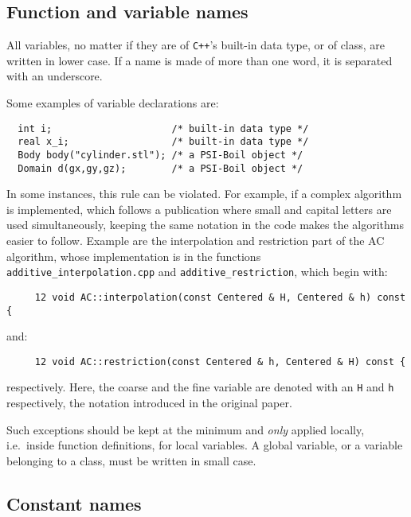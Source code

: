 \subsection{Function and variable names}

All variables, no matter if they are of {\tt C++}'s built-in data type, or of
{\psiboil} class, are written in lower case. If a name is made of more than
one word, it is separated with an underscore. 

Some examples of variable declarations are:
{\small \begin{verbatim}
  int i;                     /* built-in data type */  
  real x_i;                  /* built-in data type */  
  Body body("cylinder.stl"); /* a PSI-Boil object */ 
  Domain d(gx,gy,gz);        /* a PSI-Boil object */ 
\end{verbatim}}

In some instances, this rule can be violated. For example, if a complex 
algorithm is implemented, which follows a publication where small and capital
letters are used simultaneously, keeping the same notation in the code makes
the algorithms easier to follow. Example are the interpolation and restriction
part of the AC algorithm, whose implementation is in the functions 
{\tt additive\_interpolation.cpp} and {\tt additive\_restriction}, which 
begin with:
%
{\small \begin{verbatim}
     12 void AC::interpolation(const Centered & H, Centered & h) const {
\end{verbatim}}
%
and:
%
{\small \begin{verbatim}
     12 void AC::restriction(const Centered & h, Centered & H) const {
\end{verbatim}}
%
respectively. Here, the coarse and the fine variable are denoted with
an {\tt H} and {\tt h} respectively, the notation introduced in the
original paper. 

Such exceptions should be kept at the minimum and {\em only} applied locally,
i.e.\ inside function definitions, for local variables. A global variable, or
a variable belonging to a class, must be written in small case.

\subsection{Constant names}

